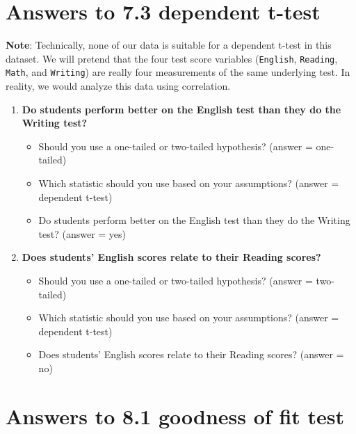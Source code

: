 \documentclass[
]{book}
\begin{document}
\hypertarget{answers-to-7.3-dependent-t-test}{%
\section{Answers to 7.3 dependent t-test}\label{answers-to-7.3-dependent-t-test}}

\textbf{Note}: Technically, none of our data is suitable for a dependent t-test in this dataset. We will pretend that the four test score variables (\texttt{English}, \texttt{Reading}, \texttt{Math}, and \texttt{Writing}) are really four measurements of the same underlying test. In reality, we would analyze this data using correlation.

\begin{enumerate}
\def\labelenumi{\arabic{enumi}.}
\item
  \textbf{Do students perform better on the English test than they do the Writing test?}

  \begin{itemize}
  \item
    Should you use a one-tailed or two-tailed hypothesis? (answer = one-tailed)
  \item
    Which statistic should you use based on your assumptions? (answer = dependent t-test)
  \item
    Do students perform better on the English test than they do the Writing test? (answer = yes)
  \end{itemize}
\item
  \textbf{Does students' English scores relate to their Reading scores?}

  \begin{itemize}
  \item
    Should you use a one-tailed or two-tailed hypothesis? (answer = two-tailed)
  \item
    Which statistic should you use based on your assumptions? (answer = dependent t-test)
  \item
    Does students' English scores relate to their Reading scores? (answer = no)
  \end{itemize}
\end{enumerate}

\hypertarget{answers-to-8.1-goodness-of-fit-test}{%
\section{Answers to 8.1 goodness of fit test}\label{answers-to-8.1-goodness-of-fit-test}}
\end{document}
